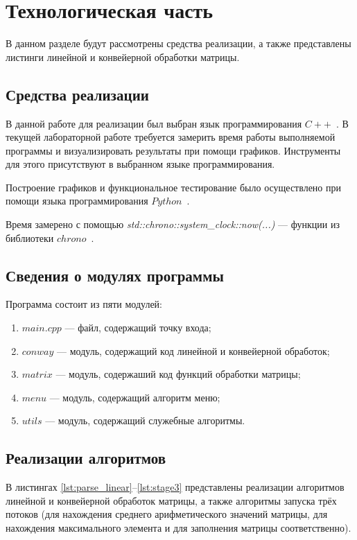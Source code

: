 \chapter{Технологическая часть}

В данном разделе будут рассмотрены средства реализации, а также представлены листинги линейной и конвейерной обработки матрицы.


\section{Средства реализации}
В данной работе для реализации был выбран язык программирования $C++$~\cite{cpp-lang}. В текущей лабораторной работе требуется замерить время работы выполняемой программы
и визуализировать результаты при помощи графиков. Инструменты для этого присутствуют в выбранном языке программирования.

Построение графиков и функциональное тестирование было осуществлено при помощи языка программирования $Python$~\cite{python-lang}.

Время замерено с помощью \textit{std::chrono::system\_clock::now(...)} --- функции из библиотеки $chrono$~\cite{cpp-lang-chrono}.


\section{Сведения о модулях программы}
Программа состоит из пяти модулей:
\begin{enumerate}[label=\arabic*)]
	\item $main.cpp$ --- файл, содержащий точку входа;
	\item $conway$ --- модуль, содержащий код линейной и конвейерной обработок;
	\item $matrix$ --- модуль, содержаший код функций обработки матрицы;
	\item $menu$ --- модуль, содержащий алгоритм меню;
	\item $utils$ --- модуль, содержащий служебные алгоритмы. 
\end{enumerate}


\section{Реализации алгоритмов}

В листингах \ref{lst:parse_linear}--\ref{lst:stage3} представлены реализации алгоритмов линейной и конвейерной обработок матрицы, а также алгоритмы запуска трёх потоков (для нахождения среднего арифметического значений матрицы, для нахождения максимального элемента и для заполнения матрицы соответственно).


